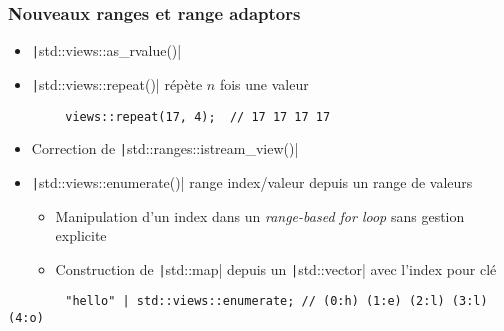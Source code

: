 \documentclass[C++.tex]{subfiles}
\begin{document}
\begin{frame}[fragile]
	\frametitle{Nouveaux ranges et range adaptors}
	\begin{itemize}
		\item \texttt|std::views::as_rvalue()|
		\item \texttt|std::views::repeat()| répète $n$ fois une valeur
	\end{itemize}

	\begin{verbatim}
		views::repeat(17, 4);  // 17 17 17 17
	\end{verbatim}

	\begin{itemize}
		\item Correction de \texttt|std::ranges::istream_view()|
		\item \texttt|std::views::enumerate()| range index/valeur depuis un range de valeurs
		\begin{itemize}
			\item Manipulation d'un index dans un \textit{range-based for loop} sans gestion explicite
			\item Construction de \texttt|std::map| depuis un \texttt|std::vector| avec l'index pour clé
		\end{itemize}
	\end{itemize}

	\begin{verbatim}
		"hello" | std::views::enumerate; // (0:h) (1:e) (2:l) (3:l) (4:o)
	\end{verbatim}



\end{frame}
\end{document}
